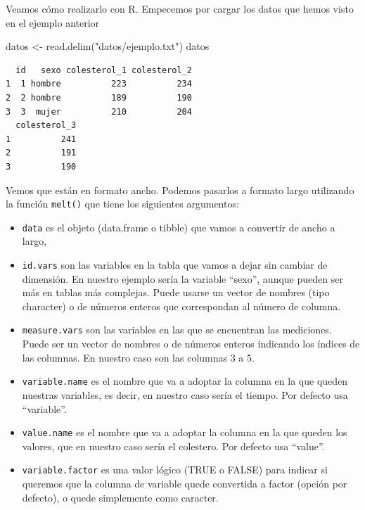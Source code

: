 \documentclass[
]{book}
\newenvironment{Shaded}{\begin{snugshade}}{\end{snugshade}}
\newcommand{\FunctionTok}[1]{\textcolor[rgb]{0.00,0.00,0.00}{#1}}
\newcommand{\NormalTok}[1]{#1}
\newcommand{\OtherTok}[1]{\textcolor[rgb]{0.56,0.35,0.01}{#1}}
\newcommand{\StringTok}[1]{\textcolor[rgb]{0.31,0.60,0.02}{#1}}
\providecommand{\tightlist}{%
  \setlength{\itemsep}{0pt}\setlength{\parskip}{0pt}}
\begin{document}
Veamos cómo realizarlo con R. Empecemos por cargar los datos que hemos visto en el ejemplo anterior

\begin{Shaded}
\begin{Highlighting}[]
\NormalTok{datos }\OtherTok{\textless{}{-}} \FunctionTok{read.delim}\NormalTok{(}\StringTok{"datos/ejemplo.txt"}\NormalTok{)}
\NormalTok{datos}
\end{Highlighting}
\end{Shaded}

\begin{verbatim}
  id   sexo colesterol_1 colesterol_2
1  1 hombre          223          234
2  2 hombre          189          190
3  3  mujer          210          204
  colesterol_3
1          241
2          191
3          190
\end{verbatim}

Vemos que están en formato ancho. Podemos pasarlos a formato largo utilizando la función \texttt{melt()} que tiene los siguientes argumentos:

\begin{itemize}
\tightlist
\item
  \texttt{data} es el objeto (data.frame o tibble) que vamos a convertir de ancho a largo,
\item
  \texttt{id.vars} son las variables en la tabla que vamos a dejar sin cambiar de dimensión. En nuestro ejemplo sería la variable ``sexo'', aunque pueden ser más en tablas más complejas. Puede usarse un vector de nombres (tipo character) o de números enteros que correspondan al número de columna.
\item
  \texttt{measure.vars} son las variables en las que se encuentran las mediciones. Puede ser un vector de nombres o de números enteros indicando los índices de las columnas. En nuestro caso son las columnas 3 a 5.
\item
  \texttt{variable.name} es el nombre que va a adoptar la columna en la que queden nuestras variables, es decir, en nuestro caso sería el tiempo. Por defecto usa ``variable''.
\item
  \texttt{value.name} es el nombre que va a adoptar la columna en la que queden los valores, que en nuestro caso sería el colestero. Por defecto usa ``value''.
\item
  \texttt{variable.factor} es una valor lógico (TRUE o FALSE) para indicar si queremos que la columna de variable quede convertida a factor (opción por defecto), o quede simplemente como caracter.
\end{itemize}
\end{document}

